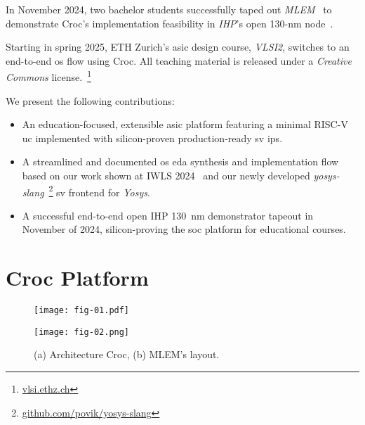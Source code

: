 \documentclass[a4paper, 10pt, unnumberedsections, twoside]{LTJournalArticle}
\newcommand{\riscv}{\mbox{RISC-V}}
\begin{document}
%
In November 2024, two bachelor students successfully taped out \emph{MLEM}~\cite{asic2024mlem} to demonstrate Croc's implementation feasibility in \emph{IHP}'s open 130-\si{nm} node~\cite{herman2024reflections}.

%
Starting in spring 2025, ETH Zurich's \gls{asic} design course, \emph{VLSI2}, switches to an end-to-end \gls{os} flow using Croc.
All teaching material is released under a \emph{Creative Commons} license.~\footnote{\url{vlsi.ethz.ch}}

We present the following contributions:
\begin{itemize}
    \item An education-focused, extensible \gls{asic} platform featuring a minimal {\riscv} \gls{uc} implemented with silicon-proven production-ready \gls{sv} \glspl{ip}.
    \item A streamlined and documented \gls{os} \gls{eda} synthesis and implementation flow based on our work shown at IWLS 2024~\cite{sauter2024insights} and our newly developed \emph{yosys-slang}~\footnote{\url{github.com/povik/yosys-slang}} \gls{sv} frontend for \emph{Yosys}. 
    \item A successful end-to-end open IHP \SI{130}{\nano\metre} demonstrator tapeout in November of 2024, silicon-proving the \gls{soc} platform for educational courses.
\end{itemize}



\section{Croc Platform}

\begin{figure}[t]
    \begin{subcaptionblock}{0.285\linewidth}%
        \centering%
        \texttt{[image: fig-01.pdf]}%
        \vspace{-0.3em}%
        \caption{}%
        \label{fig:croc-arch}%
    \end{subcaptionblock}\hfill
    \begin{subcaptionblock}{0.65\linewidth}
        \centering%
        \texttt{[image: fig-02.png]}%
        \vspace{-0.3em}%
        \caption{}%
        \label{fig:mlem-render}%
    \end{subcaptionblock}\hfill
    \vspace{-0.9em}%
    \caption{(a) Architecture Croc, (b) MLEM's layout.}
    \label{fig:croc-mlem}
\end{figure}
\end{document}
